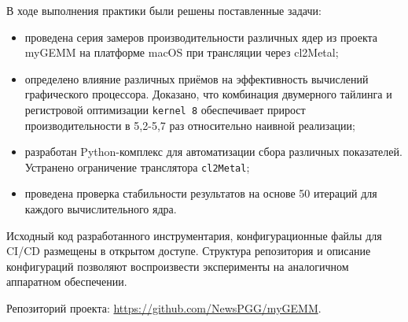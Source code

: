 \documentclass[a4paper]{article}
\begin{document}
В ходе выполнения практики были решены поставленные задачи:
\begin{itemize}
    \item проведена серия замеров производительности различных ядер из проекта myGEMM на платформе macOS при трансляции через cl2Metal;
    \item определено влияние различных приёмов на эффективность вычислений графического процессора. Доказано, что комбинация двумерного тайлинга и регистровой оптимизации \texttt{kernel 8} обеспечивает прирост производительности в 5,2-5,7 раз относительно наивной реализации;
    \item разработан Python-комплекс для автоматизации сбора различных показателей. Устранено ограничение транслятора  \texttt{cl2Metal};
    \item проведена проверка стабильности результатов на основе 50 итераций для каждого вычислительного ядра.
\end{itemize}

Исходный код разработанного инструментария, конфигурационные файлы для CI/CD размещены в открытом доступе. Структура репозитория и описание конфигураций позволяют воспроизвести эксперименты на аналогичном аппаратном обеспечении.

Репозиторий проекта: \url{https://github.com/NewsPGG/myGEMM}.
\end{document}
